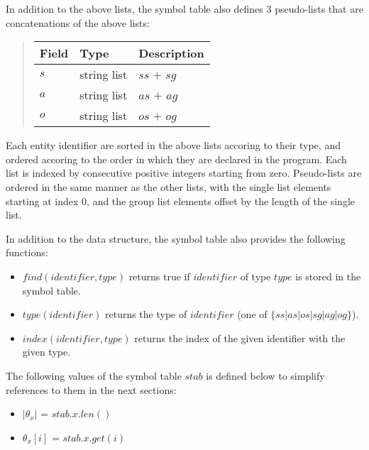 \documentclass[10pt, twocolumn]{article}
\begin{document}
          In addition to the above lists, the symbol table also defines 3
          pseudo-lists that are concatenations of the above lists:

          \begin{quote}
            \begin{tabular}[t]{|l|l|l|}
              \hline
              \textbf{Field} & \textbf{Type} & \textbf{Description} \\
              \hline
              $s$ & string list & $ss$ $+$ $sg$ \\
              \hline
              $a$ & string list & $as$ $+$ $ag$ \\
              \hline
              $o$ & string list & $os$ $+$ $og$ \\
              \hline
            \end{tabular}
          \end{quote}

          Each entity identifier are sorted in the above lists accoring to
          their type, and ordered accoring to the order in which they are
          declared in the program. Each list is indexed by consecutive
          positive integers starting from zero. Pseudo-lists are ordered in
          the same manner as the other lists, with the single list elements
          starting at index 0, and the group list elements offset by the
          length of the single list.

          In addition to the data structure, the symbol table also provides
          the following functions:

          \begin{itemize}
            \item
              $find(identifier, type)$ returns true if $identifier$ of type
              $type$ is stored in the symbol table.
            \item
              $type(identifier)$ returns the type of $identifier$ (one of
              $\{ss|as|os|sg|ag|og\}$).
            \item
              $index(identifier, type)$ returns the index of the given
              identifier with the given type.
          \end{itemize}

          The following values of the symbol table $stab$ is defined below to
          simplify references to them in the next sections:

          \begin{itemize}
            \item $|{\theta}_{x}|$ = $stab.x.len()$
            \item ${\theta}_{x}[i]$ = $stab.x.get(i)$
          \end{itemize}
\end{document}
